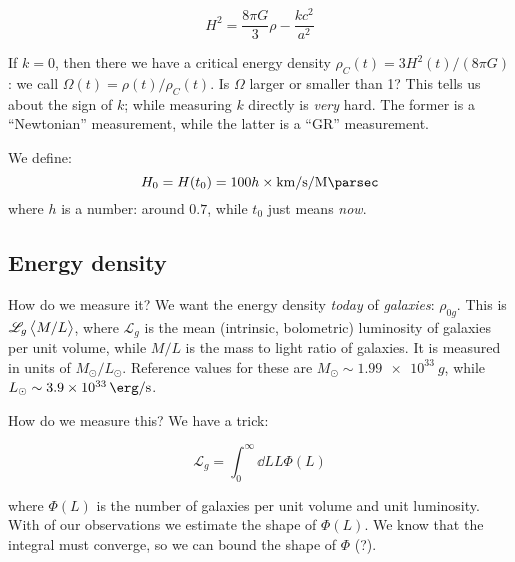 \documentclass[main.tex]{subfiles}
\begin{document}
\begin{equation}
  H^2 = \frac{8 \pi G}{3} \rho - \frac{kc^2}{a^2}
\end{equation}

If \(k=0\), then there we have a critical energy density \(\rho_C (t) = 3 H^2 (t) / (8 \pi G)\): we call \(\Omega(t) = \rho(t) / \rho_C(t)\).
Is \(\Omega\) larger or smaller than 1? This tells us about the sign of \(k\); while measuring \(k\) directly is \emph{very} hard. The former is a ``Newtonian'' measurement, while the latter is a ``GR'' measurement.

We define:
\begin{equation}
  H_0 = H(t_0) = 100 h \times \SI{}{\kilo\metre\per\second\per\mega\parsec}
\end{equation}
%
where \(h\) is a number: around \(0.7\), while  \(t_0\) just means \emph{now}.

\subsection{Energy density}

How do we measure it? We want the energy density \emph{today} of \emph{galaxies}: \(\rho_{0g}\).
This is \(\mathscr L_g \expval{M/L} \), where \(\mathscr L _g\) is the mean (intrinsic, bolometric) luminosity of galaxies per unit volume, while \(M/L\) is the mass to light ratio of galaxies.
It is measured in units of \(M_{\odot} / L_{\odot}\). Reference values for these are \(M_{\odot} \sim \SI{1.99e33}{g}\), while \(L_\odot \sim \SI{3.9e33}{\erg\per\second} \).

How do we measure this? We have a trick:

\begin{equation}
  \mathscr L _g = \int_0^\infty \dd{L} L \Phi(L)
\end{equation}

where \(\Phi(L)\) is the number of galaxies per unit volume and unit luminosity. With of our observations we estimate the shape of \(\Phi(L)\). We know that the integral must converge, so we can bound the shape of \(\Phi\) (?).
\end{document}
